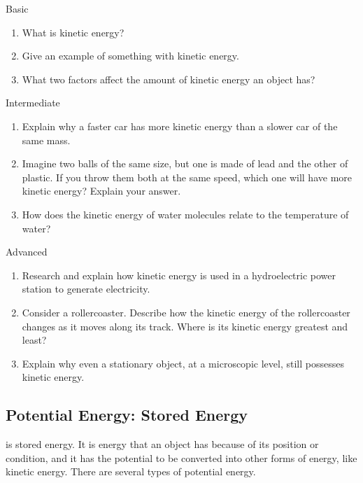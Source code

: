 \begin{tieredquestions}{Basic}
\begin{enumerate}
    \item What is kinetic energy?
    \item Give an example of something with kinetic energy.
    \item What two factors affect the amount of kinetic energy an object has?
\end{enumerate}
\end{tieredquestions}

\begin{tieredquestions}{Intermediate}
\begin{enumerate}
    \item Explain why a faster car has more kinetic energy than a slower car of the same mass.
    \item Imagine two balls of the same size, but one is made of lead and the other of plastic. If you throw them both at the same speed, which one will have more kinetic energy? Explain your answer.
    \item How does the kinetic energy of water molecules relate to the temperature of water?
\end{enumerate}
\end{tieredquestions}

\begin{tieredquestions}{Advanced}
\begin{enumerate}
    \item Research and explain how kinetic energy is used in a hydroelectric power station to generate electricity.
    \item  Consider a rollercoaster. Describe how the kinetic energy of the rollercoaster changes as it moves along its track. Where is its kinetic energy greatest and least?
    \item  Explain why even a stationary object, at a microscopic level, still possesses kinetic energy.
\end{enumerate}
\end{tieredquestions}


\subsection{Potential Energy: Stored Energy}

 is stored energy. It is energy that an object has because of its position or condition, and it has the potential to be converted into other forms of energy, like kinetic energy. There are several types of potential energy.

